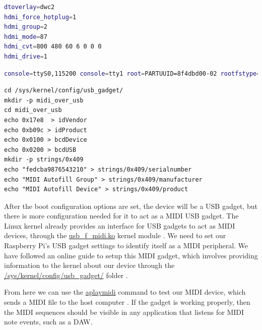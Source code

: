 \begin{minipage}{\linewidth}

  \begin{lstlisting}[language=bash,
  label={lst:bootconfig},
  caption=Lines added to /boot/config.txt \autocite{raspberryPiGadgetSetup, raspberryPiHDMIFix}.]
dtoverlay=dwc2
hdmi_force_hotplug=1
hdmi_group=2
hdmi_mode=87
hdmi_cvt=800 480 60 6 0 0 0
hdmi_drive=1
  \end{lstlisting}

  \begin{lstlisting}[language=bash, label={lst:bootcmdline}, caption=DietPi /boot/cmdline.txt modified to allow a USB Gadget \autocite{raspberryPiGadgetSetup}., breaklines=true]
console=ttyS0,115200 console=tty1 root=PARTUUID=8f4dbd00-02 rootfstype=ext4 elevator=deadline fsck.repair=yes rootwait quiet net.ifnames=0 modules-load=dwc2,g_ether
  \end{lstlisting}

  \begin{lstlisting}[label={lst:usb_gadget}, caption=Bash procedure to setup a MIDI Gadget\, modified for our device \autocite{raspberryPiGadgetSetup}., breaklines=true]
cd /sys/kernel/config/usb_gadget/
mkdir -p midi_over_usb
cd midi_over_usb
echo 0x17e8  > idVendor
echo 0xb09c > idProduct
echo 0x0100 > bcdDevice
echo 0x0200 > bcdUSB
mkdir -p strings/0x409
echo "fedcba9876543210" > strings/0x409/serialnumber
echo "MIDI Autofill Group" > strings/0x409/manufacturer
echo "MIDI Autofill Device" > strings/0x409/product
  \end{lstlisting}

\end{minipage}

After the boot configuration options are set, the device will be a USB gadget, but there
is more configuration needed for it to act as a MIDI USB gadget. The Linux kernel already
provides an interface for USB gadgets to act as MIDI devices, through the
\url{usb_f_midi.ko} kernel module \autocite{usbGadgetDocumentation}. We need to set our
Raspberry Pi's USB gadget settings to identify itself as a MIDI peripheral. We have
followed an online guide to setup this MIDI gadget, which involves providing information
to the kernel about our device through the \url{/sys/kernel/config/usb_gadget/} folder
\autocite{raspberryPiGadgetSetup}.

From here we can use the \url{aplaymidi} command to test our MIDI device, which sends a
MIDI file to the host computer \autocite{gadgetTesting}. If the gadget is working
properly, then the MIDI sequences should be visible in any application that listens for
MIDI note events, such as a DAW.

